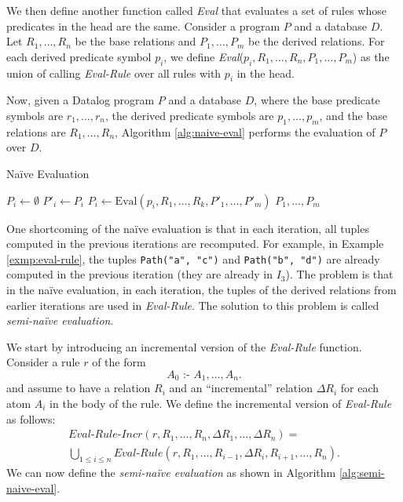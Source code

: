 \documentclass[11pt]{report}
\theoremstyle{definition}
\begin{document}
We then define another function called \textit{Eval} that evaluates a set of rules whose predicates in the head are the same. Consider a program $P$ and a database $D$. Let $R_1, \ldots, R_n$ be the base relations and $P_1, \ldots, P_m$ be the derived relations. For each derived predicate symbol $p_i$, we define \textit{Eval}($p_i, R_1, \ldots, R_n, P_1, \ldots, P_m$) as the union of calling \textit{Eval-Rule} over all rules with $p_i$ in the head.

Now, given a Datalog program $P$ and a database $D$, where the base predicate symbols are $r_1, \ldots, r_n$, the derived predicate symbols are $p_1, \ldots, p_m$, and the base relations are $R_1, \ldots, R_n$, Algorithm \ref{alg:naive-eval} performs the evaluation of $P$ over $D$.

\begin{algorithm}
  \caption{Naïve Evaluation}
  \label{alg:naive-eval}
  \begin{algorithmic}[1] %
    \State $P_i \leftarrow  \emptyset$
    \EndFor
    \Repeat
    \State $P'_i \leftarrow  P_i$
    \EndFor
    \State $P_i \leftarrow  \text{Eval}(p_i, R_1, \ldots, R_k, P'_1, \ldots, P'_m)$
    \EndFor
    \State \Return $P_1, \ldots, P_m$
  \end{algorithmic}
\end{algorithm}

One shortcoming of the na\"ive evaluation is that in each iteration, all tuples computed in the previous iterations are recomputed. For example, in Example \ref{exmp:eval-rule}, the tuples \texttt{Path("a", "c")} and \texttt{Path("b", "d")} are already computed in the previous iteration (they are already in $I_3$). The problem is that in the na\"ive evaluation, in each iteration, the tuples of the derived relations from earlier iterations are used in \textit{Eval-Rule}. The solution to this problem is called \textit{semi-na\"ive evaluation}.

We start by introducing an incremental version of the \textit{Eval-Rule} function. Consider a rule $r$ of the form
$$A_0 \text{ :- } A_1, \ldots, A_n.$$
and assume to have a relation $R_i$ and an “incremental” relation $\Delta R_i$ for each atom $A_i$ in the body of the rule. We define the incremental version of \textit{Eval-Rule} as follows:
\begin{equation*}
  \begin{split}
    \textit{Eval-Rule-Incr}(r, R_1, \ldots, R_n,  \Delta R_1, \ldots, \Delta R_n) = \\
    \bigcup_{1 \leq i \leq n} \textit{Eval-Rule}(r, R_1, \ldots, R_{i-1}, \Delta R_i, R_{i+1}, \ldots, R_n).
  \end{split}
\end{equation*}
We can now define the \textit{semi-naïve evaluation} as shown in Algorithm \ref{alg:semi-naive-eval}.
\end{document}
